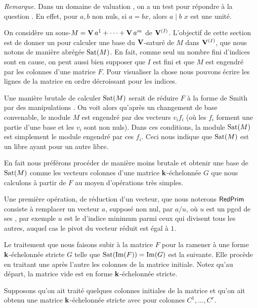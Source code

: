 \noindent \textsl{Remarque.}
Dans un domaine de valuation \dcd, on a un test pour répondre à la question
 . En effet, pour $a,b$ non nuls, si $a=bx$, alors $a\mid b$ \ssi $x$ est une unité.



\medskip  
On considère un sous-\Vmo $M=\mathbf{V} \,a^1+\cdots+\mathbf{V} \, a^m$ de $\mathbf{V}^{(I)}$.
L'objectif de cette section est de donner un \algo pour calculer une 
base 
du $\mathbf{V}$-saturé de $M$ dans $\mathbf{V}^{(I)}$, \Vmo que nous notons de manière abrégée
$\mathrm{Sat}(M)$.
En fait, comme seul un nombre fini d'indices sont en cause, on peut aussi 
bien supposer que $I$ est fini et que $M$ est engendré par les colonnes d'une matrice $F$.
Pour visualiser la chose nous pouvons écrire les lignes de la matrice
en ordre décroissant pour les indices.
 
Une manière brutale de calculer $\mathrm{Sat}(M)$ serait de réduire $F$ 
à la forme de Smith par des manipulations \elrs.
On voit alors qu'après un changement de base convenable, le module $M$
est engendré par des vecteurs $v_if_i$ (où les $f_i$ forment une partie
d'une base
et les $v_i$ sont non nuls). Dans ces conditions, la module $\mathrm{Sat}(M)$
est simplement le module engendré par ces $f_i$.
Ceci nous indique que $\mathrm{Sat}(M)$ est un \Vmo libre ayant pour \sul un autre 
\Vmo libre.

\smallskip
 En fait nous préférons procéder de manière moins brutale et
obtenir une base de  $\mathrm{Sat}(M)$ comme les vecteurs colonnes d'une matrice
 $\mathbf{k}$-échelonnée  $G$ que nous calculons à partir de $F$ au moyen d'opérations très simples.

Une première opération, de réduction d'un vecteur, que nous noterons 
$\mathsf{RedPrim}$ consiste à remplacer un vecteur  $a$, supposé non nul, par
$a/u$, où $u$ est un pgcd de ses \coes, par exemple $u$ est le \coe d'indice minimum parmi ceux qui divisent tous les autres, auquel cas le \coe pivot du vecteur réduit est égal à $1$. 

 
Le traitement que nous faisons subir à la matrice $F$ 
pour la ramener à une forme $\mathbf{k}$-échelonnée stricte $G$
telle que $\mathrm{Sat}(\mathrm{Im}(F))= \mathrm{Im}(G)$  est la
suivante. Elle procède en traitant une après l'autre les colonnes de la matrice initiale.
Notez qu'au départ, la matrice vide est en forme $\mathbf{k}$-échelonnée stricte. 

Supposons qu'on ait traité quelques colonnes initiales de la matrice et qu'on
ait obtenu une matrice $\mathbf{k}$-échelonnée stricte avec pour colonnes 
$C^1,\dots,C^r$.

